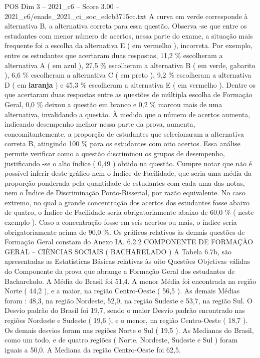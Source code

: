 \begin{textsample}{POS Dim 3 – 2021\_c6 – Score 3.00 – 2021\_c6/enade\_2021\_ci\_soc\_edcb3715cc.txt}
A curva em verde corresponde à alternativa B, a alternativa correta para essa questão.
Observa -se que entre os estudantes com menor número de acertos, nessa parte do exame, a situação mais frequente foi a escolha da alternativa E ( em vermelho ), incorreta.
Por exemplo, entre os estudantes que acertaram duas respostas, 11,2 \% escolheram a alternativa A ( em azul ), 27,5 \% escolheram a alternativa B ( em verde, gabarito ), 6,6 \% escolheram a alternativa C ( em preto ), 9,2 \% escolheram a alternativa D ( em \textbf{laranja} ) e 45,3 \% escolheram a alternativa E ( em vermelho ).
Dentre os que acertaram duas respostas entre as questões de múltipla escolha de Formação Geral, 0,0 \% deixou a questão em branco e 0,2 \% marcou mais de uma alternativa, invalidando a questão.
À medida que o número de acertos aumenta, indicando desempenho melhor nessa parte da prova, aumenta, concomitantemente, a proporção de estudantes que selecionaram a alternativa correta B, atingindo 100 \% para os estudantes com oito acertos.
Essa análise permite verificar como a questão discriminou os grupos de desempenho, justificando -se o alto índice ( 0,49 ) obtido na questão.
Cumpre notar que não é possível inferir deste gráfico nem o Índice de Facilidade, que seria uma média da proporção ponderada pela quantidade de estudantes com cada uma das notas, nem o Índice de Discriminação Ponto-Bisserial, por razão equivalente.
No caso extremo, no qual a grande concentração dos acertos dos estudantes fosse abaixo de quatro, o Índice de Facilidade seria obrigatoriamente abaixo de 60,0 \% ( neste exemplo ).
Caso a concentração fosse em seis acertos ou mais, o índice seria obrigatoriamente acima de 90,0 \%.
Os gráficos relativos às demais questões de Formação Geral constam do Anexo IA. 6.2.2 COMPONENTE DE FORMAÇÃO GERAL – CIÊNCIAS SOCIAIS ( BACHARELADO ) A Tabela 6.7b, são apresentadas as Estatísticas Básicas relativas às oito Questões Objetivas válidas do Componente da prova que abrange a Formação Geral dos estudantes de Bacharelado.
A Média do Brasil foi 51,4.
A menor Média foi encontrada na região Norte ( 44,2 ), e a maior, na região Centro-Oeste ( 56,5 ).
As demais Médias foram : 48,3, na região Nordeste, 52,0, na região Sudeste e 53,7, na região Sul.
O Desvio padrão do Brasil foi 19,7, sendo o maior Desvio padrão encontrado nas regiões Nordeste e Sudeste ( 19,6 ), e o menor, na região Centro-Oeste ( 18,7 ).
Os demais desvios foram nas regiões Norte e Sul ( 19,5 ).
As Medianas do Brasil, como um todo, e de quatro regiões ( Norte, Nordeste, Sudeste e Sul ) foram iguais a 50,0.
A Mediana da região Centro-Oeste foi 62,5.

\end{textsample}

